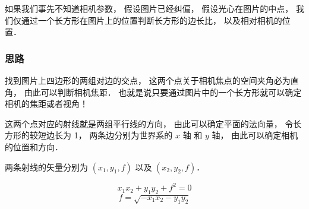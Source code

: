 

如果我们事先不知道相机参数， 假设图片已经纠偏， 假设光心在图片的中点， 我们仅通过一个长方形在图片上的位置判断长方形的边长比， 以及相对相机的位置．

\subsubsection{思路}

找到图片上四边形的两组对边的交点， 这两个点关于相机焦点的空间夹角必为直角， 由此可以判断相机焦距． 也就是说只要通过图片中的一个长方形就可以确定相机的焦距或者视角！

这两个点对应的射线就是两组平行线的方向， 由此可以确定平面的法向量， 令长方形的较短边长为 1， 两条边分别为世界系的 $x$ 轴 和 $y$ 轴， 由此可以确定相机的位置和方向．

两条射线的矢量分别为 $(x_1, y_1, f)$ 以及 $(x_2, y_2, f)$．

\begin{equation}
x_1 x_2 + y_1 y_2 + f^2 = 0
\end{equation}
\begin{equation}
f = \sqrt{-x_1 x_2 - y_1 y_2}
\end{equation}

